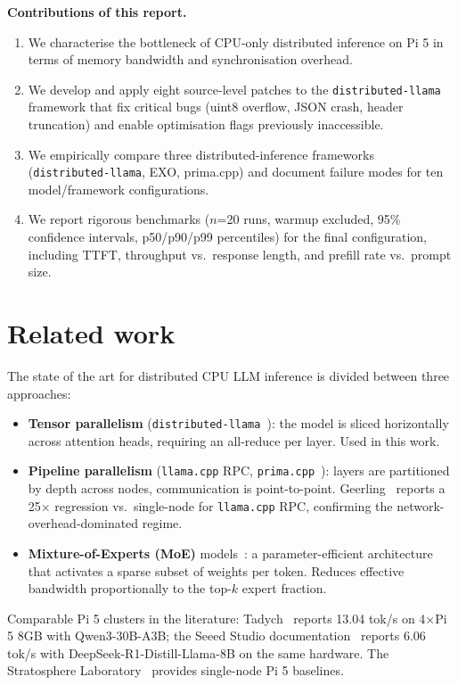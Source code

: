 \documentclass[11pt,a4paper]{article}
\begin{document}
\textbf{Contributions of this report.}
\begin{enumerate}[leftmargin=*,nosep]
  \item We characterise the bottleneck of CPU-only distributed inference on Pi 5 in terms of memory bandwidth and synchronisation overhead.
  \item We develop and apply eight source-level patches to the \texttt{distributed-llama} framework that fix critical bugs (uint8 overflow, JSON crash, header truncation) and enable optimisation flags previously inaccessible.
  \item We empirically compare three distributed-inference frameworks (\texttt{distributed-llama}, EXO, prima.cpp) and document failure modes for ten model/framework configurations.
  \item We report rigorous benchmarks ($n$=20 runs, warmup excluded, 95\% confidence intervals, p50/p90/p99 percentiles) for the final configuration, including TTFT, throughput vs.\ response length, and prefill rate vs.\ prompt size.
\end{enumerate}

\section{Related work}

The state of the art for distributed CPU LLM inference is divided between three approaches:
\begin{itemize}[leftmargin=*,nosep]
  \item \textbf{Tensor parallelism} (\texttt{distributed-llama}~\cite{tadych2024}): the model is sliced horizontally across attention heads, requiring an all-reduce per layer. Used in this work.
  \item \textbf{Pipeline parallelism} (\texttt{llama.cpp} RPC, \texttt{prima.cpp}~\cite{li2025prima}): layers are partitioned by depth across nodes, communication is point-to-point. Geerling~\cite{geerling2025} reports a 25$\times$ regression vs.\ single-node for \texttt{llama.cpp} RPC, confirming the network-overhead-dominated regime.
  \item \textbf{Mixture-of-Experts (MoE)} models~\cite{jiang2024,qwen3}: a parameter-efficient architecture that activates a sparse subset of weights per token. Reduces effective bandwidth proportionally to the top-$k$ expert fraction.
\end{itemize}

Comparable Pi 5 clusters in the literature: Tadych~\cite{tadych2024,dllama_discussion255} reports 13.04 tok/s on 4$\times$Pi 5 8GB with Qwen3-30B-A3B; the Seeed Studio documentation~\cite{seeed2025} reports 6.06 tok/s with DeepSeek-R1-Distill-Llama-8B on the same hardware. The Stratosphere Laboratory~\cite{stratosphere2025} provides single-node Pi 5 baselines.
\end{document}
